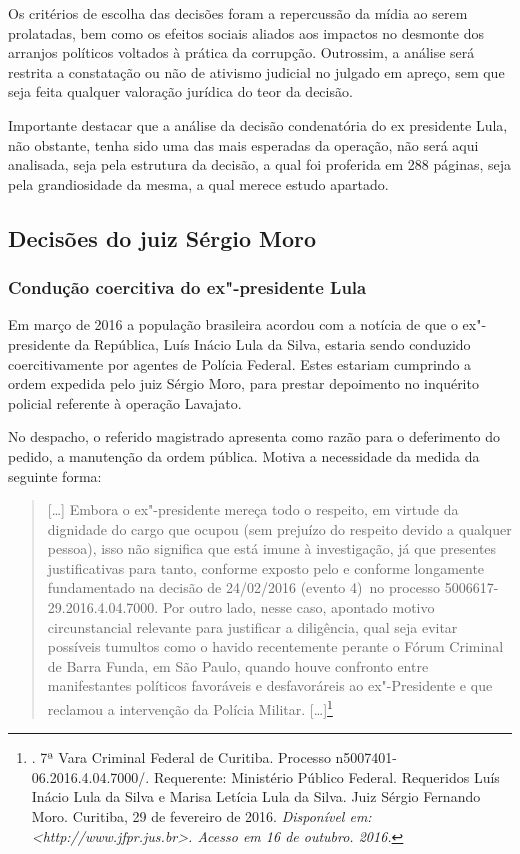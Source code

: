 Os critérios de escolha das decisões foram a repercussão da mídia ao
serem prolatadas, bem como os efeitos sociais aliados aos impactos no
desmonte dos arranjos políticos voltados à prática da corrupção.
Outrossim, a análise será restrita a constatação ou não de ativismo
judicial no julgado em apreço, sem que seja feita qualquer valoração
jurídica do teor da decisão.

Importante destacar que a análise da decisão condenatória do ex
presidente Lula, não obstante, tenha sido uma das mais esperadas da
operação, não será aqui analisada, seja pela estrutura da decisão, a
qual foi proferida em 288 páginas, seja pela grandiosidade da mesma, a
qual merece estudo apartado.

\subsection{Decisões do juiz Sérgio Moro}

\subsubsection{Condução coercitiva do ex"-presidente Lula}

Em março de 2016 a população brasileira acordou com a notícia de que o
ex"-presidente da República, Luís Inácio Lula da Silva, estaria sendo
conduzido coercitivamente por agentes de Polícia Federal. Estes estariam
cumprindo a ordem expedida pelo juiz Sérgio Moro, para prestar
depoimento no inquérito policial referente à operação Lavajato.

No despacho, o referido magistrado apresenta como razão para o
deferimento do pedido, a manutenção da ordem pública. Motiva a
necessidade da medida da seguinte forma:

\begin{quote}
{[}\ldots{}{]} Embora o ex"-presidente mereça todo o respeito, em virtude da
dignidade do cargo que ocupou (sem prejuízo do respeito devido a
qualquer pessoa), isso não significa que está imune à investigação, já
que presentes justificativas para tanto, conforme exposto pelo  e
conforme longamente fundamentado na decisão de 24/02/2016 (evento 4)~no
processo 5006617-29.2016.4.04.7000. Por outro lado, nesse caso, apontado
motivo circunstancial relevante para justificar a diligência, qual seja
evitar possíveis tumultos como o havido recentemente perante o Fórum
Criminal de Barra Funda, em São Paulo, quando houve confronto entre
manifestantes políticos favoráveis e desfavoráreis ao ex"-Presidente e
que reclamou a intervenção da Polícia Militar. {[}\ldots{}{]}\footnote{.
  7ª Vara Criminal Federal de Curitiba. Processo
  n5007401-06.2016.4.04.7000/. Requerente: Ministério Público Federal.
  Requeridos Luís Inácio Lula da Silva e Marisa Letícia Lula da Silva.
  Juiz Sérgio Fernando Moro. Curitiba, 29 de fevereiro de 2016.
  \emph{Disponível em: \textless{}http://www.jfpr.jus.br\textgreater{}.
  Acesso em 16 de outubro. 2016.}}
\end{quote}

